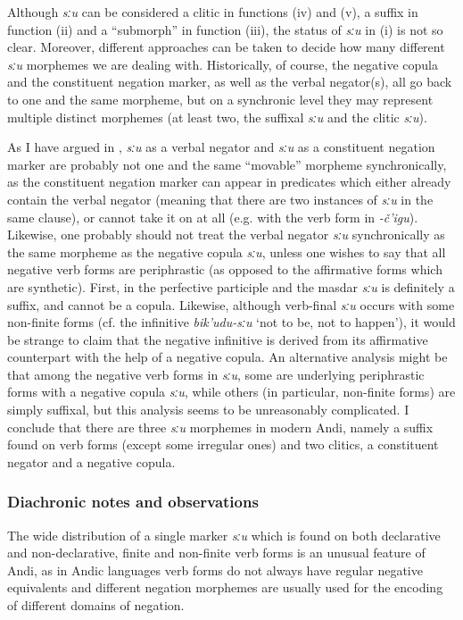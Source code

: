 \documentclass[output=paper,colorlinks=true, citecolor=brown]{langscibook}
\begin{document}
Although \textit{sːu} can be considered a clitic in functions (iv) and (v), a suffix in function (ii) and a “submorph” in function (iii), the status of \textit{sːu} in (i) is not so clear. Moreover, different approaches can be taken to decide how many different \textit{sːu} morphemes we are dealing with. Historically, of course, the negative copula and the constituent negation marker, as well as the verbal negator(s), all go back to one and the same morpheme, but on a synchronic level they may represent multiple distinct morphemes (at least two, the suffixal \textit{sːu} and the clitic \textit{sːu}).

As I have argued in , \textit{sːu} as a verbal negator and \textit{sːu} as a constituent negation marker are probably not one and the same “movable” morpheme synchronically, as the constituent negation marker can appear in predicates which either already contain the verbal negator (meaning that there are two instances of \textit{sːu} in the same clause), or cannot take it on at all (e.g. with the verb form in \textit{\nobreakdash-č’igu}). Likewise, one probably should not treat the verbal negator \textit{sːu} synchronically as the same morpheme as the negative copula \textit{sːu}, unless one wishes to say that all negative verb forms are periphrastic (as opposed to the affirmative forms which are synthetic). First, in the perfective participle and the masdar \textit{sːu} is definitely a suffix, and cannot be a copula. Likewise, although verb-final \textit{sːu} occurs with some non-finite forms (cf. the infinitive \textit{bik’udu-sːu} ‘not to be, not to happen’), it would be strange to claim that the negative infinitive is derived from its affirmative counterpart with the help of a negative copula. An alternative analysis might be that among the negative verb forms in \textit{sːu}, some are underlying periphrastic forms with a negative copula \textit{sːu}, while others (in particular, non-finite forms) are simply suffixal, but this analysis seems to be unreasonably complicated. I conclude that there are three \textit{sːu} morphemes in modern Andi, namely a suffix found on verb forms (except some irregular ones) and two clitics, a constituent negator and a negative copula.

\subsubsection{Diachronic notes and observations} \label{sec:and:4.6.4}

The wide distribution of a single marker \textit{sːu} which is found on both declarative and non-declarative, finite and non-finite verb forms is an unusual feature of Andi, as in Andic languages verb forms do not always have regular negative equivalents and\textsf{} different negation morphemes are usually used for the encoding of different domains of negation.
\end{document}
